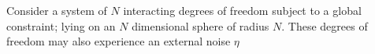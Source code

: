Consider a system of $N$ interacting degrees of freedom subject to a global constraint; lying on an $N$ dimensional sphere of radius $N$. These degrees of freedom may also experience an external noise $\eta$